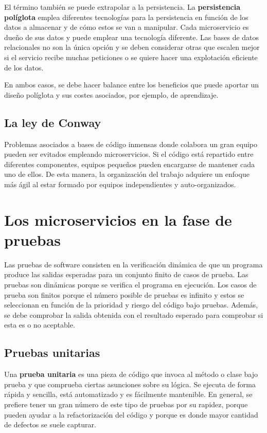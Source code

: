 \documentclass[11pt,spanish,listoffigures]{tfgetsinf}
\begin{document}
El término también se puede extrapolar a la persistencia. La \textbf{persistencia políglota} emplea diferentes tecnologías para la persistencia en función de los datos a almacenar y de cómo estos se van a manipular. Cada microservicio es dueño de sus datos y puede emplear una tecnología diferente. Las bases de datos relacionales no son la única opción y se deben considerar otras que escalen mejor si el servicio recibe muchas peticiones o se quiere hacer una explotación eficiente de los datos. \cite{Fowler2011}

En ambos casos, se debe hacer balance entre los beneficios que puede aportar un diseño políglota y sus costes asociados, por ejemplo, de aprendizaje.

\subsection{La ley de Conway}

Problemas asociados a bases de código inmensas donde colabora un gran equipo pueden ser evitados empleando microservicios. Si el código está repartido entre diferentes componentes, equipos pequeños pueden encargarse de mantener cada uno de ellos. De esta manera, la organización del trabajo adquiere un enfoque más ágil al estar formado por equipos independientes y auto-organizados.


\section{Los microservicios en la fase de pruebas}

Las pruebas de software consisten en la verificación dinámica de que un programa produce las salidas esperadas para un conjunto finito de casos de prueba. Las pruebas son dinámicas porque se verifica el programa en ejecución. Los casos de prueba son finitos porque el número posible de pruebas es infinito y estos se seleccionan en función de la prioridad y riesgo del código bajo pruebas. Además, se debe comprobar la salida obtenida con el resultado esperado para comprobar si esta es o no aceptable. \cite{Bourque2014}

\subsection{Pruebas unitarias}

Una \textbf{prueba unitaria} es una pieza de código que invoca al método o clase bajo prueba y que comprueba ciertas asunciones sobre su lógica. Se ejecuta de forma rápida y sencilla, está automatizado y es fácilmente mantenible. \cite{Osherove2014} En general, se prefiere tener un gran número de este tipo de pruebas por su rapidez, porque pueden ayudar a la refactorización del código y porque es donde mayor cantidad de defectos se suele capturar.
\end{document}
